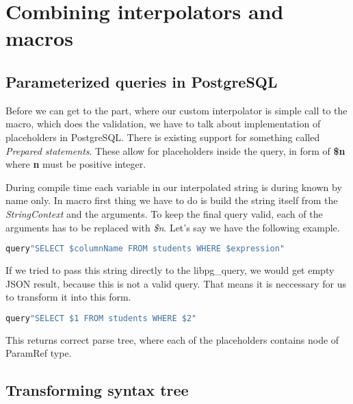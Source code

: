 \section{Combining interpolators and macros}
\subsection{Parameterized queries in PostgreSQL}
Before we can get to the part, where our custom interpolator is simple call to the macro, which does the validation, we have to talk about implementation of placeholders in PostgreSQL. There is existing support for something called \textit{Prepared statements}. These allow for placeholders inside the query, in form of \textbf{\$n} where \textbf{n} must be positive integer.  

During compile time each variable in our interpolated string is during known by name only. In macro first thing we have to do is build the string itself from the \textit{StringContext} and the arguments. To keep the final query valid, each of the arguments has to be replaced with \textit{\$n}. 
Let's say we have the following example.
\begin{lstlisting}[language=scala, showstringspaces=false]
query"SELECT $columnName FROM students WHERE $expression"
\end{lstlisting}
If we tried to pass this string directly to the libpg\_query, we would get empty JSON result, because this is not a valid query. That means it is neccessary for us to transform it into this form.
\begin{lstlisting}[language=scala, showstringspaces=false]
query"SELECT $1 FROM students WHERE $2"
\end{lstlisting}
This returns correct parse tree, where each of the placeholders contains node of ParamRef type. 


\subsection{Transforming syntax tree}
